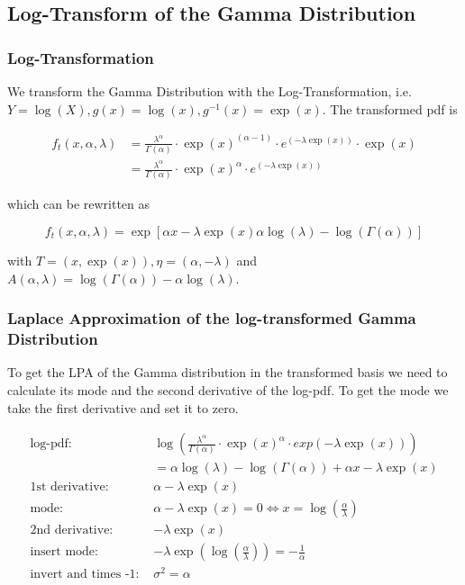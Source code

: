\subsection{Log-Transform of the Gamma Distribution}

\subsubsection{Log-Transformation}

We transform the Gamma Distribution with the Log-Transformation, i.e. $Y = \log(X), g(x) = \log(x), g^{-1}(x) = \exp(x)$. The transformed pdf is

\begin{align}
f_t(x, \alpha, \lambda) &= \frac{\lambda^\alpha}{\Gamma(\alpha)} \cdot \exp(x)^{(\alpha - 1)} \cdot e^{(-\lambda \exp(x))} \cdot \exp(x) \\ \nonumber
&=\frac{\lambda^\alpha}{\Gamma(\alpha)} \cdot \exp(x)^{\alpha} \cdot e^{(-\lambda \exp(x))}
\end{align}

which can be rewritten as

\begin{equation}
	f_t(x, \alpha, \lambda) = \exp \left[\alpha x - \lambda \exp(x) \alpha \log(\lambda) - \log(\Gamma(\alpha))\right]	
	\label{eq:exp_gamma_trans}
\end{equation}

with $T = (x, \exp(x)), \eta = (\alpha, -\lambda)$ and $A(\alpha, \lambda) = \log(\Gamma(\alpha)) - \alpha  \log(\lambda)$. 


\subsubsection{Laplace Approximation of the log-transformed Gamma Distribution}

To get the LPA of the Gamma distribution in the transformed basis we need to calculate its mode and the second derivative of the log-pdf. To get the mode we take the first derivative and set it to zero. 

\begin{align*}
\text{log-pdf: } &\log\left(\frac{\lambda^\alpha}{\Gamma(\alpha)} \cdot \exp(x)^{\alpha} \cdot exp(-\lambda \exp(x)) \right) \\
&= \alpha \log(\lambda) - \log(\Gamma(\alpha)) + \alpha x - \lambda \exp(x)\\
\text{1st derivative: }&  \alpha - \lambda \exp(x)\\
\text{mode: }& \alpha - \lambda \exp(x) = 0 \Leftrightarrow x = \log\left(\frac{\alpha}{\lambda}\right)\\
\text{2nd derivative: }&  -\lambda \exp(x)\\
\text{insert mode: }& -\lambda \exp(\log\left(\frac{\alpha}{\lambda}\right)) = -\frac{1}{\alpha} \\
\text{invert and times -1: }&\sigma^2 = \alpha 
\end{align*}


